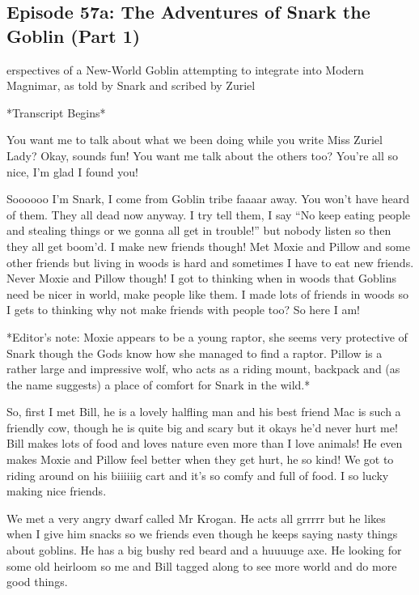 \subsection{Episode 57a: The Adventures of Snark the Goblin (Part 1)}

erspectives of a New-World Goblin attempting to integrate into Modern Magnimar, as told by Snark and scribed by Zuriel\medskip

*Transcript Begins*\medskip

You want me to talk about what we been doing while you write Miss Zuriel Lady? Okay, sounds fun! You want me talk about the others too? You’re all so nice, I’m glad I found you!\medskip

Soooooo I’m Snark, I come from Goblin tribe faaaar away. You won’t have heard of them. They all dead now anyway. I try tell them, I say “No keep eating people and stealing things or we gonna all get in trouble!” but nobody listen so then they all get boom’d. I make new friends though! Met Moxie and Pillow and some other friends but living in woods is hard and sometimes I have to eat new friends. Never Moxie and Pillow though! I got to thinking when in woods that Goblins need be nicer in world, make people like them. I made lots of friends in woods so I gets to thinking why not make friends with people too? So here I am!\medskip

*Editor’s note: Moxie appears to be a young raptor, she seems very protective of Snark though the Gods know how she managed to find a raptor. Pillow is a rather large and impressive wolf, who acts as a riding mount, backpack and (as the name suggests) a place of comfort for Snark in the wild.*\medskip

So, first I met Bill, he is a lovely halfling man and his best friend Mac is such a friendly cow, though he is quite big and scary but it okays he’d never hurt me! Bill makes lots of food and loves nature even more than I love animals! He even makes Moxie and Pillow feel better when they get hurt, he so kind! We got to riding around on his biiiiiig cart and it’s so comfy and full of food. I so lucky making nice friends.\medskip

We met a very angry dwarf called Mr Krogan. He acts all grrrrr but he likes when I give him snacks so we friends even though he keeps saying nasty things about goblins. He has a big bushy red beard and a huuuuge axe. He looking for some old heirloom so me and Bill tagged along to see more world and do more good things.\medskip

